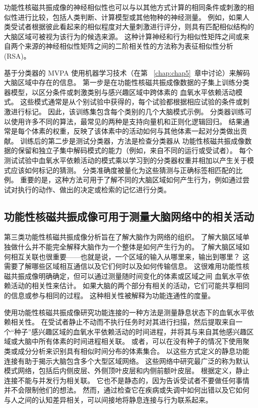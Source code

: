 功能性核磁共振成像的神经相似性也可以与以其他方式计算的相同条件或刺激的相似性进行比较，包括人类判断、计算模型或其他物种的神经测量。
例如，如果人类受试者根据彼此看起来的相似程度对大量刺激进行评分，则具有匹配相似结构的大脑区域可被视为该行为的候选来源。
这种计算神经和行为相似性矩阵之间或来自两个来源的神经相似性矩阵之间的二阶相关性的方法称为表征相似性分析 (RSA)。


基于分类器的 MVPA 使用机器学习技术（在第 ~\ref{chap:chap5}~章中讨论）来解码大脑区域中存在的信息。 
第一步是在功能性核磁共振成像数据的子集上训练分类器模型，以区分条件或刺激类别与感兴趣区域中跨体素的 血氧水平依赖活动模式。
这些模式通常是从个别试验中获得的，每个试验都根据相应试验的条件或刺激进行标记。 
因此，该训练集包含每个类别的几个大脑模式示例。 
分类器训练可以使用许多不同的算法，最常见的两种是支持向量机和正则化逻辑回归。
结果通常是每个体素的权重，反映了该体素中的活动如何与其他体素一起对分类做出贡献。
训练后的第二步是测试分类器，方法是检查分类器从 功能性核磁共振成像数据的保留和独立子集中解码模式的能力（例如，来自不同的运行或受试者）。
每个测试试验中血氧水平依赖活动的模式乘以学习到的分类器权重并相加以产生关于模式应该如何标记的猜测。
分类准确度被量化为这些猜测与正确标签相匹配的比例。
重要的是，这种方法可用于了解不同的大脑区域如何产生行为，例如通过尝试对执行的动作、做出的决定或检索的记忆进行分类。



\subsection{功能性核磁共振成像可用于测量大脑网络中的相关活动}

第三类功能性核磁共振成像分析旨在了解大脑作为网络的组织。
了解大脑区域单独做什么并不能完全解释大脑作为一个整体是如何产生行为的。
了解大脑区域如何相互关联也很重要——也就是说，一个区域的输入从哪里来，输出到哪里？
这需要了解哪些区域相互通信以及它们何时以及如何传输信息。
这很难用功能性核磁共振成像明确确定，但可以通过测量随时间变化的体素或区域之间 血氧水平依赖活动的相关性来估计。
如果大脑的两个部分有相关的活动，它们可能共享相同的信息或参与相同的过程。
这种相关性被解释为功能连通性的度量。


使用功能性核磁共振成像研究功能连接的一种方法是测量静息状态下的血氧水平依赖相关性。 
在受试者静止不动而不执行任务时对其进行扫描，然后提取来自一个“种子”感兴趣区域的血氧水平依赖活动的时间进程，并将其与来自其他感兴趣区域或大脑中所有体素的时间进程相关联。
或者，可以在没有种子的情况下使用聚类或成分分析来识别具有相似时间分布的体素集合。
以这些方式定义的静息功能连接有助于揭示大脑包含多个大型区域网络。
这些网络中研究最广泛的称为默认模式网络，包括后内侧皮层、外侧顶叶皮层和内侧前额叶皮层。
根据定义，静止连接不能与并发行为相关联。
它也不是静态的，因为告诉受试者不要做任何事情并不会限制他们的想法。
然而，通过检查它在疾病或失调中如何出错以及它如何与人之间的认知差异相关，可以间接地将静息连接与行为联系起来。


